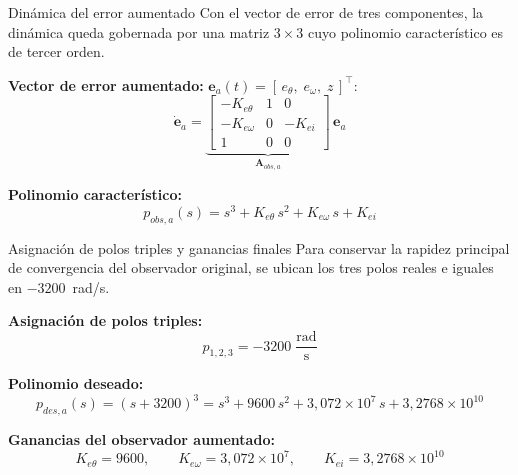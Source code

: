 \documentclass[aspectratio=169,t]{beamer}
\begin{document}
\begin{frame}{Dinámica del error aumentado}
{\small\color{uncGray}Con el vector de error de tres componentes, la dinámica queda gobernada por una matriz $3\times 3$ cuyo polinomio característico es de tercer orden.}\par
\vspace{3mm}

\textbf{Vector de error aumentado:} $\bm{e}_a(t) = [\,e_\theta,\;e_\omega,\;z\,]^\top$:
\begin{equation*}
\dot{\bm{e}}_a = \underbrace{\begin{bmatrix}
-K_{e\theta} & 1 & 0 \\
-K_{e\omega} & 0 & -K_{ei} \\
1 & 0 & 0
\end{bmatrix}}_{\bm{A}_{obs,a}}\,\bm{e}_a
\end{equation*}

\textbf{Polinomio característico:}
\begin{equation*}
p_{obs,a}(s) = s^{3} + K_{e\theta}\,s^{2} + K_{e\omega}\,s + K_{ei}
\end{equation*}
\end{frame}

\begin{frame}{Asignación de polos triples y ganancias finales}
{\small\color{uncGray}Para conservar la rapidez principal de convergencia del observador original, se ubican los tres polos reales e iguales en $-3200$~rad/s.}\par
\vspace{3mm}

\textbf{Asignación de polos triples:}
\begin{equation*}
p_{1,2,3} = -3200\;\frac{\text{rad}}{\text{s}}
\end{equation*}

\textbf{Polinomio deseado:}
\begin{equation*}
p_{des,a}(s) = (s + 3200)^{3} = s^{3} + 9600\,s^{2} + 3{,}072\!\times\!10^{7}\,s + 3{,}2768\!\times\!10^{10}
\end{equation*}

\textbf{Ganancias del observador aumentado:}
\begin{equation*}
\boxed{\;
K_{e\theta} = 9600,
\qquad
K_{e\omega} = 3{,}072\!\times\!10^{7},
\qquad
K_{ei} = 3{,}2768\!\times\!10^{10}
\;}
\end{equation*}
\end{frame}
\end{document}
